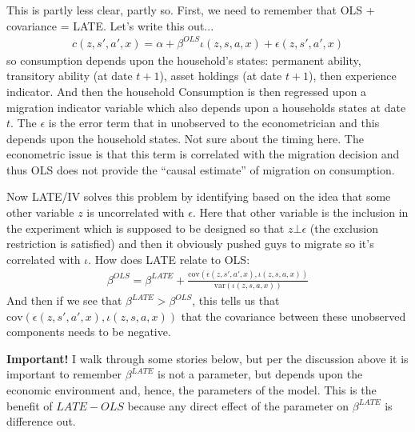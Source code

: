 \documentclass[pdftex,11pt]{article}
\begin{document}
This is partly less clear, partly so. First, we need to remember that OLS + covariance = LATE. Let's write this out...
\begin{align}
c(z,s',a',x) = \alpha + \beta^{OLS} \iota(z,s,a,x) + \epsilon(z,s',a',x)
\end{align}
so consumption depends upon the household's states: permanent ability, transitory ability (at date $t+1$), asset holdings (at date $t+1$), then experience indicator. And then the household Consumption is then regressed upon a migration indicator variable which also depends upon a households states at date $t$.  The $\epsilon$ is the error term that in unobserved to the econometrician and this depends upon the household states. Not sure about the timing here. The econometric issue is that this term is correlated with the migration decision and thus OLS does not provide the ``causal estimate'' of migration on consumption.

Now LATE/IV solves this problem by identifying based on the idea that some other variable $z$ is uncorrelated with $\epsilon$. Here that other variable is the inclusion in the experiment which is supposed to be designed so that $z \bot  \epsilon$ (the exclusion restriction is satisfied) and then it obviously pushed guys to migrate so it's correlated with $\iota$. How does LATE relate to OLS:
\begin{align}
\beta^{OLS} = \beta^{LATE} + \frac{\mathrm{cov}( \epsilon(z,s',a',x), \iota(z,s,a,x))} {\mathrm{var}(\iota(z,s,a,x))}
\end{align}
And then if we see that $\beta^{LATE} > \beta^{OLS}$, this tells us that $\mathrm{cov}( \epsilon(z,s',a',x), \iota(z,s,a,x))$ that the covariance between these unobserved components needs to be negative. 

\textbf{Important!} I walk through some stories below, but per the discussion above it is important to remember $\beta^{LATE}$ is not a parameter, but depends upon the economic environment and, hence, the parameters of the model. This is the benefit of $LATE - OLS$ because any direct effect of the parameter on $\beta^{LATE}$ is difference out. 
\end{document}
